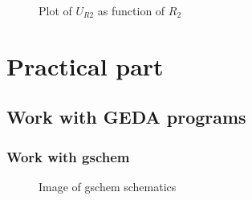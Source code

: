 \documentclass{report}
\begin{document}
\begin{figure}[!b]
    \centering
    \caption{Plot of $U_{R2}$ as function of $R_2$}
    \label{U_R2 plot}
\end{figure}

\chapter{Practical part}

\section{Work with GEDA programs}

\subsection{Work with gschem}

\begin{figure}[H]
    \centering
     \caption{Image of gschem schematics}
    \label{gschem}
\end{figure}
\end{document}
